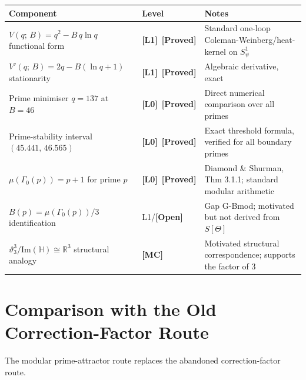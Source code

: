 \documentclass[12pt,a4paper]{article}
\theoremstyle{definition}
\theoremstyle{remark}
\newcommand{\RR}{\mathbb{R}}
\newcommand{\HH}{\mathbb{H}}
\newcommand{\vth}{\vartheta}
\newcommand{\PROVED}{\textbf{[Proved]}}
\newcommand{\OPEN}{\textbf{[Open]}}
\newcommand{\MC}{\textbf{[MC]}}
\newcommand{\Lone}{\textbf{[L1]}}
\newcommand{\Lzero}{\textbf{[L0]}}
\begin{document}
\begin{center}
\renewcommand{\arraystretch}{1.35}
\begin{tabular}{p{4.5cm} p{2.2cm} p{6cm}}
\toprule
\textbf{Component} & \textbf{Level} & \textbf{Notes} \\
\midrule
$V(q;\,B) = q^2 - B\,q\ln q$ functional form
  & \Lone\ \PROVED
  & Standard one-loop Coleman-Weinberg/heat-kernel on $S^1_\psi$ \\
$V'(q;\,B) = 2q - B(\ln q + 1)$ stationarity
  & \Lone\ \PROVED
  & Algebraic derivative, exact \\
Prime minimiser $q = 137$ at $B = 46$
  & \Lzero\ \PROVED
  & Direct numerical comparison over all primes \\
Prime-stability interval $(45.441,\,46.565)$
  & \Lzero\ \PROVED
  & Exact threshold formula, verified for all boundary primes \\
$\mu(\Gamma_0(p)) = p+1$ for prime $p$
  & \Lzero\ \PROVED
  & Diamond \& Shurman, Thm 3.1.1; standard modular arithmetic \\
$B(p) = \mu(\Gamma_0(p))/3$ identification
  & L1/\OPEN
  & Gap G-Bmod; motivated but not derived from $S[\Theta]$ \\
$\vth_3^3/\mathrm{Im}(\HH) \cong \RR^3$ structural analogy
  & \MC
  & Motivated structural correspondence; supports the factor of 3 \\
\bottomrule
\end{tabular}
\end{center}

\section{Comparison with the Old Correction-Factor Route}
\label{sec:mpat:comparison}

The modular prime-attractor route replaces the abandoned correction-factor route.
\end{document}
